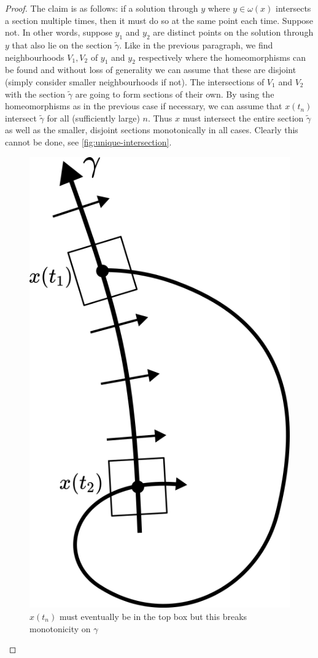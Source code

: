 \begin{proof}
The claim is as follows: if a solution through $y$ where $y \in \omega(x)$ intersects a section multiple times, then it must do so at the same point each time. Suppose not. In other words, suppose $y_1$ and $y_2$ are distinct points on the solution through $y$ that also lie on the section $\tilde{\gamma}$. Like in the previous paragraph, we find neighbourhoods $V_1, V_2$ of $y_1$ and $y_2$ respectively where the homeomorphisms can be found and without loss of generality we can assume that these are disjoint (simply consider smaller neighbourhoods if not). The intersections of $V_1$ and $V_2$ with the section $\tilde{\gamma}$ are going to form sections of their own. By using the homeomorphisms as in the previous case if necessary, we can assume that $x(t_n)$ intersect $\tilde{\gamma}$ for all (sufficiently large) $n$. Thus $x$ must intersect the entire section $\tilde{\gamma}$ as well as the smaller, disjoint sections monotonically in all cases. Clearly this cannot be done, see \autoref{fig:unique-intersection}.

\begin{figure}[h]
    \centering
    \includegraphics[scale=0.4]{Images/unique_intersection.png}
    \caption{$x(t_n)$ must eventually be in the top box but this breaks monotonicity on $\gamma$}
    \label{fig:unique-intersection}
\end{figure}


\end{proof}
